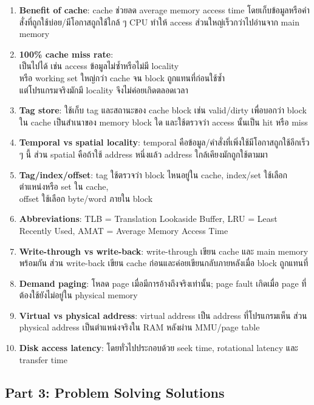 \documentclass[a4paper,12pt]{article}
\begin{document}
\begin{enumerate}
    \item \textbf{Benefit of cache}: cache ช่วยลด average memory access time โดยเก็บข้อมูลหรือคำสั่งที่ถูกใช้บ่อย/มีโอกาสถูกใช้ใกล้ ๆ CPU ทำให้ access ส่วนใหญ่เร็วกว่าไปอ่านจาก main memory
    \item \textbf{100\% cache miss rate}:\\
    เป็นไปได้ เช่น access ข้อมูลไม่ซ้ำหรือไม่มี locality\\
    หรือ working set ใหญ่กว่า cache จน block ถูกแทนที่ก่อนใช้ซ้ำ\\
    แต่โปรแกรมจริงมักมี locality จึงไม่ค่อยเกิดตลอดเวลา
    \item \textbf{Tag store}: ใช้เก็บ tag และสถานะของ cache block เช่น valid/dirty เพื่อบอกว่า block ใน cache เป็นสำเนาของ memory block ใด และใช้ตรวจว่า access นั้นเป็น hit หรือ miss
    \item \textbf{Temporal vs spatial locality}: temporal คือข้อมูล/คำสั่งที่เพิ่งใช้มีโอกาสถูกใช้อีกเร็ว ๆ นี้ ส่วน spatial คือถ้าใช้ address หนึ่งแล้ว address ใกล้เคียงมักถูกใช้ตามมา
    \item \textbf{Tag/index/offset}: tag ใช้ตรวจว่า block ไหนอยู่ใน cache, index/set ใช้เลือกตำแหน่งหรือ set ใน cache,\\ offset ใช้เลือก byte/word ภายใน block
    \item \textbf{Abbreviations}: TLB = Translation Lookaside Buffer, LRU = Least Recently Used, AMAT = Average Memory Access Time
    \item \textbf{Write-through vs write-back}: write-through เขียน cache และ main memory พร้อมกัน ส่วน write-back เขียน cache ก่อนและค่อยเขียนกลับภายหลังเมื่อ block ถูกแทนที่
    \item \textbf{Demand paging}: โหลด page เมื่อมีการอ้างถึงจริงเท่านั้น; page fault เกิดเมื่อ page ที่ต้องใช้ยังไม่อยู่ใน physical memory
    \item \textbf{Virtual vs physical address}: virtual address เป็น address ที่โปรแกรมเห็น ส่วน physical address เป็นตำแหน่งจริงใน RAM หลังผ่าน MMU/page table
    \item \textbf{Disk access latency}: โดยทั่วไปประกอบด้วย seek time, rotational latency และ transfer time
\end{enumerate}

\subsection*{Part 3: Problem Solving Solutions}
\end{document}
